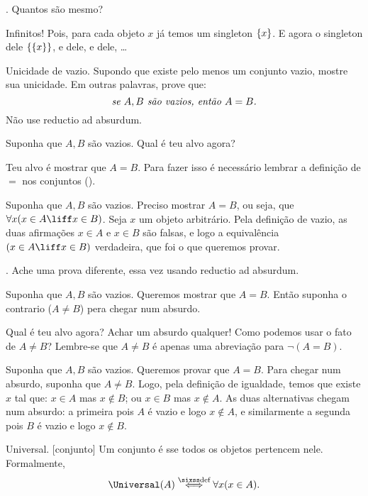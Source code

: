\exercise.
\label{how_many_singletons}%
Quantos são mesmo?

\solution
Infinitos!  Pois, para cada objeto $x$ já temos um singleton $\set{x}$.
E agora o singleton dele $\set{\set{x}}$, e dele, e dele, \dots

\endexercise

\exercise Unicidade de vazio.
\label{naive_uniqueness_of_emptyset}%
Supondo que existe pelo menos um conjunto vazio, mostre sua unicidade.
Em outras palavras, prove que:
$$
\text{\emph{se $A,B$ são vazios, então $A = B$.}}
$$
Não use reductio ad absurdum.

\hint
Suponha que $A,B$ são vazios.
Qual é teu alvo agora?

\hint
Teu alvo é mostrar que $A = B$.
Para fazer isso é necessário lembrar a definição de $=$ nos conjuntos ().

\solution
Suponha que $A,B$ são vazios.
Preciso mostrar $A=B$, ou seja, que $\forall x( x\in A \liff x \in B )$.
Seja $x$ um objeto arbitrário.
Pela definição de vazio, as duas afirmações $x \in A$ e $x \in B$ são
falsas, e logo a equivalência $(x\in A \liff x\in B)$ verdadeira,
que foi o que queremos provar.

\endexercise

\exercise.
\label{naive_uniqueness_of_emptyset_absurdum}%
Ache uma prova diferente, essa vez usando reductio ad absurdum.

\hint
Suponha que $A,B$ são vazios.
Queremos mostrar que $A = B$.
Então suponha o contrario ($A \neq B$) pera chegar num absurdo.

\hint
Qual é teu alvo agora?
Achar um absurdo qualquer!
Como podemos usar o fato de $A \neq B$?
Lembre-se que $A \neq B$ é apenas uma abreviação para $\lnot(A = B)$.

\solution
Suponha que $A,B$ são vazios.
Queremos provar que $A = B$.
Para chegar num absurdo, suponha que $A \neq B$.
Logo, pela definição de igualdade, temos
que existe $x$ tal que:
$x \in A$ mas $x \notin B$; ou $x \in B$ mas $x \notin A$.
As duas alternativas chegam num absurdo:
a primeira pois $A$ é vazio e logo $x \notin A$, e similarmente
a segunda pois $B$ é vazio e logo $x \notin B$.

\endexercise

 Universal.
[conjunto]%
%
\label{universal}%
Um conjunto é  sse todos os objetos pertencem nele.
Formalmente,
$$
\Universal(A) \defiff \forall x(x \in A).
$$

